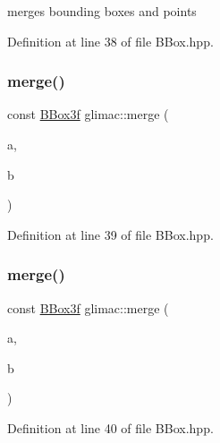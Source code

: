 merges bounding boxes and points 

Definition at line 38 of file B\+Box.\+hpp.

\mbox{\label{namespaceglimac_af4d6083700d9822693de16c3e39c68c3}} 
\subsubsection{\texorpdfstring{merge()}{merge()}\hspace{0.1cm}{\footnotesize\ttfamily [2/6]}}
{\footnotesize\ttfamily const \hyperlink{structglimac_1_1_b_box3f}{B\+Box3f} glimac\+::merge (\begin{DoxyParamCaption}\item[{const \hyperlink{group__core__types_ga1c47e8b3386109bc992b6c48e91b0be7}{glm\+::vec3} \&}]{a,  }\item[{const \hyperlink{structglimac_1_1_b_box3f}{B\+Box3f} \&}]{b }\end{DoxyParamCaption})\hspace{0.3cm}{\ttfamily [inline]}}



Definition at line 39 of file B\+Box.\+hpp.

\mbox{\label{namespaceglimac_adf530cee77a4b3dadb118123627246b7}} 
\subsubsection{\texorpdfstring{merge()}{merge()}\hspace{0.1cm}{\footnotesize\ttfamily [3/6]}}
{\footnotesize\ttfamily const \hyperlink{structglimac_1_1_b_box3f}{B\+Box3f} glimac\+::merge (\begin{DoxyParamCaption}\item[{const \hyperlink{structglimac_1_1_b_box3f}{B\+Box3f} \&}]{a,  }\item[{const \hyperlink{structglimac_1_1_b_box3f}{B\+Box3f} \&}]{b }\end{DoxyParamCaption})\hspace{0.3cm}{\ttfamily [inline]}}



Definition at line 40 of file B\+Box.\+hpp.

\mbox{\label{namespaceglimac_a50870ad9d151e88df52a4e3734bb1643}} 
